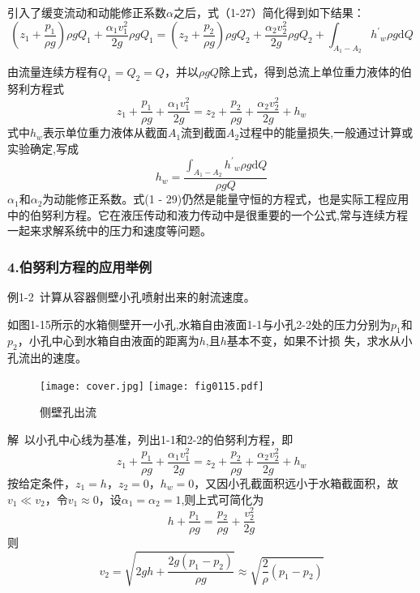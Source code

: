 引入了缓变流动和动能修正系数$\alpha$之后，式（1-27）简化得到如下结果：
\begin{equation*}
(z_1+\frac{p_1}{\rho g})\rho gQ_1+\frac{\alpha_1v_1^2}{2g}\rho gQ_1=(z_2+\frac{p_2}{\rho g})\rho gQ_2+\frac{\alpha_2v_2^2}{2g}\rho gQ_2+\int_{A_1-A_2} {h^{'}}_w{\rho} g \mathrm{d}Q
\end{equation*}

由流量连续方程有$Q_1=Q_2=Q$，并以$\rho gQ$除上式，得到总流上单位重力液体的伯努利方程式
\begin{equation}
z_1+\frac{p_1}{\rho g}+\frac{\alpha_1v_1^2}{2g}=z_2+\frac{p_2}{\rho g}+\frac{\alpha_2v_2^2}{2g}+h_w
\end{equation}
式中$h_w$表示单位重力液体从截面$A_1$流到截面$A_2$过程中的能量损失,一般通过计算或实验确定,写成
\begin{equation}
h_w=\frac{\int_{A_1-A_2} {h^{'}}_w{\rho} g \mathrm{d}Q}{\rho gQ}
\end{equation}
$\alpha_1$和$\alpha_2$为动能修正系数。式(1 - 29)仍然是能量守恒的方程式，也是实际工程应用中的伯努利方程。它在液压传动和液力传动中是很重要的一个公式,常与连续方程一起来求解系统中的压力和速度等问题。

\subsubsection*{4.伯努利方程的应用举例}

例1-2\ 计算从容器侧壁小孔喷射出来的射流速度。

如图1-15所示的水箱侧壁开一小孔,水箱自由液面1-1与小孔2-2处的压力分别为$p_1$和$p_2$，小孔中心到水箱自由液面的距离为$h$,且$h$基本不变，如果不计损
失，求水从小孔流出的速度。

\begin{figure}[htb]
\centering
\ifOpenSource
\texttt{[image: cover.jpg]}   
\else
\texttt{[image: fig0115.pdf]}
\fi
\caption{侧壁孔出流}
\label{fig:fig0115}
\end{figure}

解\ 以小孔中心线为基准，列出1-1和2-2的伯努利方程，即
\begin{equation*}
z_1+\frac{p_1}{\rho g}+\frac{\alpha_1v_1^2}{2g}=z_2+\frac{p_2}{\rho g}+\frac{\alpha_2v_2^2}{2g}+h_w
\end{equation*}
按给定条件，$z_1=h$，$z_2=0$，$h_w=0$，又因小孔截面积远小于水箱截面积，故$v_1\ll v_2$，令$v_1\approx 0$，设$\alpha_1=\alpha_2=1$,则上式可简化为
\begin{equation*}
    h+\frac{p_1}{\rho g}=\frac{p_2}{\rho g}+\frac{v_2^2}{2g}
\end{equation*}
则
\begin{equation*}
  v_2=\sqrt{2gh+\frac{2g(p_1-p_2)}{\rho g}}\approx \sqrt{\frac{2}{\rho}(p_1-p_2)}
\end{equation*}

